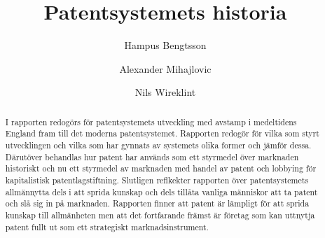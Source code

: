 \documentclass[12pt,a4paper]{article}
\begin{document}
\title{Patentsystemets historia}
\author{Hampus Bengtsson \and Alexander Mihajlovic \and Nils Wireklint}


\maketitle
{}
\begin{abstract}
I rapporten redogörs för patentsystemets utveckling med avstamp i medeltidens England fram till det moderna patentsystemet. Rapporten redogör för vilka som styrt utvecklingen och vilka som har gynnats av systemets olika former och jämför dessa. Därutöver behandlas hur patent har används som ett styrmedel över marknaden historiskt och nu ett styrmedel av marknaden med handel av patent och lobbying för kapitalistisk patentlagstiftning. Slutligen reflkekter rapporten över patentsystemets allmännytta dels i att sprida kunskap och dels tillåta vanliga människor att ta patent och slå sig in på marknaden. Rapporten finner att patent är lämpligt för att sprida kunskap till allmänheten men att det fortfarande främst är företag som kan uttnytja patent fullt ut som ett strategiskt marknadsinstrument.
\end{abstract}
  
  

\listoftodos



\setcounter{page}{1}

\newpage
\tableofcontents

\newpage

























\newpage


\end{document}
